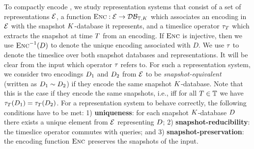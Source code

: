 To compactly encode \SKrels{},
 we study
representation systems that consist of a set of representations
$\mathcal{E}$, a function
$\textsc{Enc}: \mathcal{E} \to \mathcal{DB}_{\mathbb{T},K}$ which associates an encoding in $\mathcal{E}$ with the
snapshot $K$-database it represents, and a
timeslice operator $\tau_{T}$ which extracts the snapshot at
time $T$ from an  encoding.
If $\textsc{Enc}$ is injective, then we use $\textsc{Enc}^{-1}(D)$ to denote the unique encoding associated with $D$.
We use $\tau_{}$ to
denote the timeslice over both snapshot databases and
representations. It will be clear from the input which
operator $\tau_{}$ refers to.
%
For such a representation system, %
we consider two encodings $D_1$ and
$D_2$ from $\mathcal{E}$ to be
\textit{snapshot-equivalent}~\cite{DBLP:reference/db/JensenS09j}
(written as $D_1 \sim D_2$)
if they encode the same snapshot $K$-database. Note that this is the case if they encode the same snapshots, i.e.,
iff for all
$T \in \mathbb{T}$ we have
$\tau_{T}(D_1) = \tau_{T}(D_2)$. For a representation
system to behave correctly, the following conditions have to be met:
1) \textbf{uniqueness}:
for each snapshot $K$-database $D$ there exists a unique element
from $\mathcal{E}$ representing $D$;
2)
\textbf{snapshot-reducibility}: the timeslice operator commutes with
queries; and
3) \textbf{snapshot-preservation}: the encoding function $\textsc{Enc}$
preserves the snapshots of the input.





